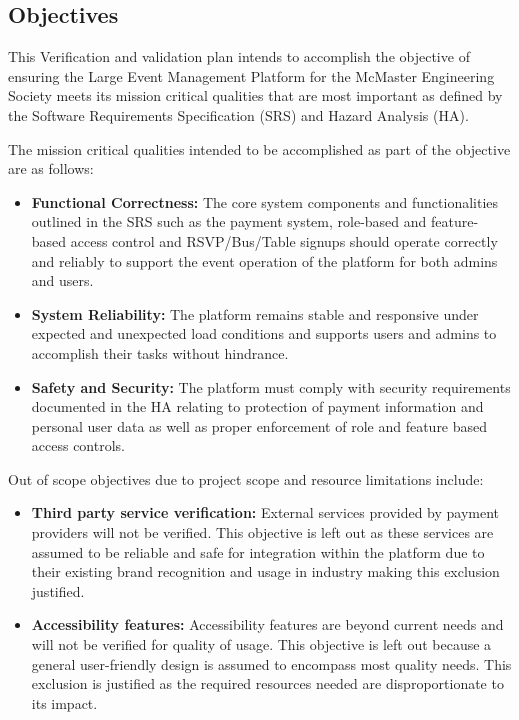 \documentclass[12pt, titlepage]{article}
\begin{document}
\subsection{Objectives}
This Verification and validation plan intends to accomplish the objective of ensuring the Large Event Management Platform for the McMaster Engineering Society meets its mission critical qualities that are most important as defined by the Software Requirements Specification (SRS) and Hazard Analysis (HA).

The mission critical qualities intended to be accomplished as part of the objective are as follows:
\begin{itemize}
    \item \textbf{Functional Correctness:} The core system components and functionalities outlined in the SRS such as the payment system, role-based and feature-based access control and RSVP/Bus/Table signups should operate correctly and reliably to support the event operation of the platform for both admins and users.
    \item \textbf{System Reliability:} The platform remains stable and responsive under expected and unexpected load conditions and supports users and admins to accomplish their tasks without hindrance.
    \item \textbf{Safety and Security:} The platform must comply with security requirements documented in the HA relating to protection of payment information and personal user data as well as proper enforcement of role and feature based access controls.    
\end{itemize}

Out of scope objectives due to project scope and resource limitations include:
\begin{itemize}
    \item \textbf{Third party service verification:} External services provided by payment providers will not be verified. This objective is left out as these services are assumed to be reliable and safe for integration within the platform due to their existing brand recognition and usage in industry making this exclusion justified. 
    \item \textbf{Accessibility features:} Accessibility features are beyond current needs and will not be verified for quality of usage. This objective is left out because a general user-friendly design is assumed to encompass most quality needs. This exclusion is justified as the required resources needed are disproportionate to its impact.    
\end{itemize}
\end{document}
